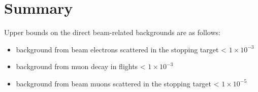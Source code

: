 \documentclass[12pt]{article}
\begin{document}




\newpage
\section{Summary}
Upper bounds on the direct beam-related backgrounds are as follows:
\begin{itemize}
\item
  background from beam electrons scattered in the stopping target < $1 \times 10^{-3}$
\item
  background from muon decay in flights < $1 \times 10^{-3}$
\item
  background from beam muons scattered in the stopping target < $1 \times 10^{-5}$
\end{itemize}
%
\newpage


\end{document}
